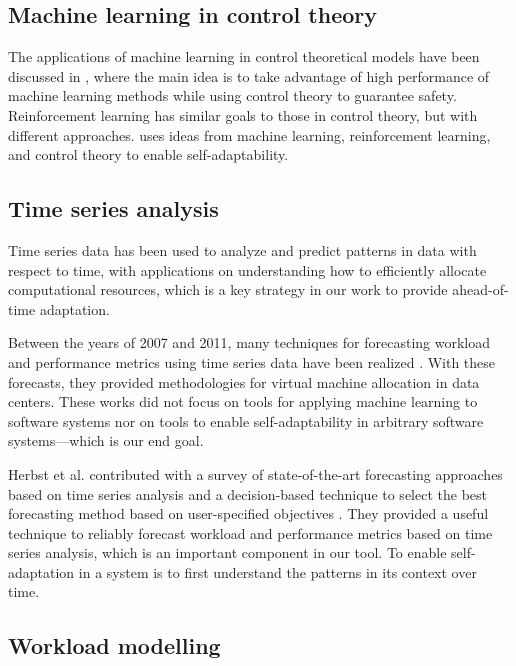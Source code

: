\subsection{Machine learning in control theory}
The applications of machine learning in control theoretical models have been discussed in \cite{Gillula10_FusingMachineLearningControlTheory}, where the main idea is to take advantage of high performance of machine learning methods while using control theory to guarantee safety. Reinforcement learning \cite{Sutton:1998:IRL:551283} has similar goals to those in control theory, but with different approaches. \projectname{} uses ideas from machine learning, reinforcement learning, and control theory to enable self-adaptability.

\subsection{Time series analysis}

Time series data has been used to analyze and predict patterns in data with respect to time, with applications on understanding how to efficiently allocate computational resources, which is a key strategy in our work to provide ahead-of-time adaptation.

Between the years of 2007 and 2011, many techniques for forecasting workload and performance metrics using time series data have been realized \cite{gmach2007workload, towards_autonomic_allocation, bobroff2007dynamic, meng2010efficient, caron2011pattern}. With these forecasts, they provided methodologies for virtual machine allocation in data centers. These works did not focus on tools for applying machine learning to software systems nor on tools to enable self-adaptability in arbitrary software systems---which is our end goal.

Herbst et al. contributed with a survey of state-of-the-art forecasting approaches based on time series analysis and a decision-based technique to select the best forecasting method based on user-specified objectives \cite{herbst_self-adaptive_2014}. They provided a useful technique to reliably forecast workload and performance metrics based on time series analysis, which is an important component in our tool. To enable self-adaptation in a system is to first understand the patterns in its context over time.

\subsection{Workload modelling}

